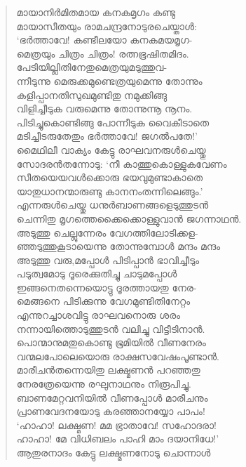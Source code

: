 \begin{verse}
മായാനിര്‍മിതമായ കനകമൃഗം കണ്ടു\\
മായാസീതയും രാമചന്ദ്രനോടുരചെയ്താള്‍:\\
‘ഭര്‍ത്താവേ! കണ്ടീലയോ കനകമയമൃഗ-\\
മെത്രയും ചിത്രം ചിത്രം! രത്നഭൂഷിതമിദം.\\
പേടിയില്ലിതിനേതുമെത്രയുമടുത്തുവ-\\
ന്നീടുന്നു മെരുക്കമുണ്ടെത്രയുമെന്നു തോന്നും\\
കളിപ്പാനതിസുഖമുണ്ടിതു നമുക്കിങ്ങു\\
വിളിച്ചീടുക വരുമെന്നു തോന്നുന്നൂ നൂനം.\\
പിടിച്ചുകൊണ്ടിങ്ങു പോന്നീടുക വൈകീടാതെ\\
മടിച്ചീടരുതേതും ഭര്‍ത്താവേ! ജഗല്‍പതേ!’\\
മൈഥിലീ വാക്യം കേട്ടു രാഘവനരുള്‍ചെയ്തു\\
സോദരന്‍തന്നോടു: ‘നീ കാത്തുകൊള്ളുകവേണം\\
സീതയെയവള്‍ക്കൊരു ഭയവുമുണ്ടാകാതെ\\
യാതുധാനന്മാരുണ്ടു കാനനംതന്നിലെങ്ങും.’\\
എന്നരുള്‍ചെയ്തു ധനുര്‍ബാണങ്ങളെടുത്തുടന്‍\\
ചെന്നിതു മൃഗത്തെക്കൈക്കൊള്ളുവാന്‍ ജഗന്നാഥന്‍.\\
അടുത്തു ചെല്ലുന്നേരം വേഗത്തിലോടിക്കള-\\
ഞ്ഞടുത്തുകൂടായെന്നു തോന്നുമ്പോള്‍ മന്ദം മന്ദം\\
അടുത്തു വരു,മപ്പോള്‍ പിടിപ്പാന്‍ ഭാവിച്ചീടും\\
പടുത്വമോടു ദൂരെക്കുതിച്ചു ചാടുമപ്പോള്‍\\
ഇങ്ങനെതന്നെയൊട്ടു ദൂരത്തായതു നേര-\\
മെങ്ങനെ പിടിക്കുന്നു വേഗമുണ്ടിതിനേറ്റം\\
എന്നുറച്ചാശവിട്ടു രാഘവനൊരു ശരം\\
നന്നായിത്തൊടുത്തുടന്‍ വലിച്ചു വിട്ടീടിനാന്‍.\\
പൊന്മാനുമതുകൊണ്ടു ഭൂമിയില്‍ വീണനേരം\\
വന്മലപോലെയൊരു രാക്ഷസവേഷംപൂണ്ടാന്‍.\\
മാരീചന്‍തന്നെയിതു ലക്ഷ്മണന്‍ പറഞ്ഞതു\\
നേരത്രേയെന്നു രഘുനാഥനും നിരൂപിച്ചു.\\
ബാണമേറ്റവനിയില്‍ വീണപ്പോള്‍ മാരീചനും\\
പ്രാണവേദനയോടു കരഞ്ഞാനയ്യോ പാപം!\\
‘ഹാഹാ! ലക്ഷ്മണ! മമ ഭ്രാതാവേ! സഹോദരാ!\\
ഹാഹാ! മേ വിധിബലം പാഹി മാം ദയാനിധേ!’\\
ആതുരനാദം കേട്ടു ലക്ഷ്മണനോടു ചൊന്നാള്‍\\

\end{verse}
